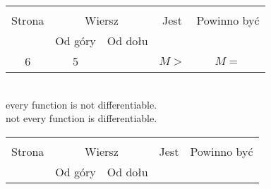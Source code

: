 \documentclass[a4paper,11pt]{article}
\begin{document}
\vspace{\spaceTwo}







\begin{center}
  \begin{tabular}{|c|c|c|c|c|}
    \hline
    & \multicolumn{2}{c|}{} & & \\
    Strona & \multicolumn{2}{c|}{Wiersz} & Jest
                              & Powinno być \\ \cline{2-3}
    & Od góry & Od dołu & & \\
    \hline
    6   &  5 & & $M >$ & $M =$ \\
    \hline
  \end{tabular}
\end{center}
\noi \\
\Jest every function is not differentiable. \\
\Pow not every function is differentiable. \\

\vspace{\spaceTwo}







\begin{center}
  \begin{tabular}{|c|c|c|c|c|}
    \hline
    & \multicolumn{2}{c|}{} & & \\
    Strona & \multicolumn{2}{c|}{Wiersz} & Jest
                              & Powinno być \\ \cline{2-3}
    & Od góry & Od dołu & & \\
    \hline
    \hline
  \end{tabular}
\end{center}
\end{document}
